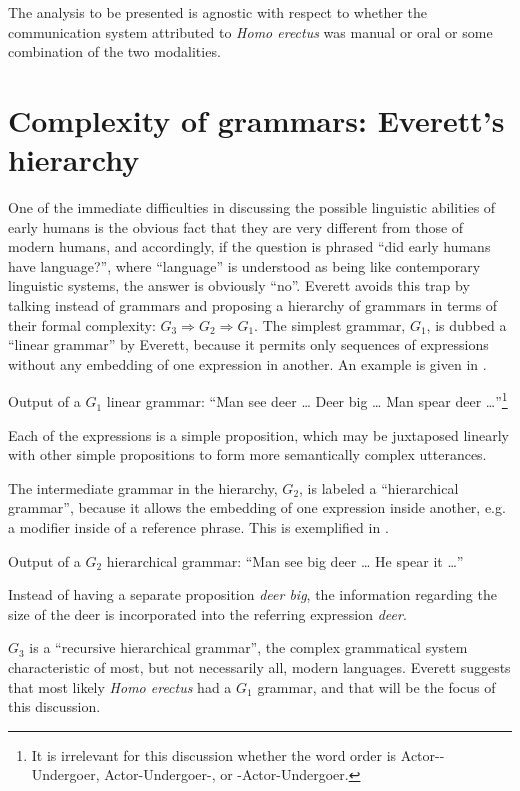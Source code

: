 \documentclass[output=paper,colorlinks,citecolor=brown]{langscibook}
\begin{document}
The analysis to be presented is agnostic with respect to whether the communication system attributed to \emph{Homo erectus} was manual or oral or some combination of the two modalities.

\section{Complexity of grammars: Everett’s hierarchy}\label{sec:vanvalin:2}
One of the immediate difficulties in discussing the possible linguistic abilities of early humans is the obvious fact that they are very different from those of modern humans, and accordingly, if the question is phrased “did early humans have language?”, where “language” is understood as being like contemporary linguistic systems, the answer is obviously “no”.  Everett avoids this trap by talking instead of grammars and proposing a hierarchy of grammars in terms of their formal complexity: $G_3 \Rightarrow G_2 \Rightarrow G_1$.  The simplest grammar, $G_1$, is dubbed a “linear grammar” by Everett, because it permits only sequences of expressions without any embedding of one expression in another. An example is given in .

\ea \label{vanvalin_example_1}
Output of a $G_1$ linear grammar: “Man see deer \ldots{}  Deer big \ldots{}  Man spear deer \ldots”\footnote{It is irrelevant for this discussion whether the word order is Actor--Undergoer, Actor-Undergoer-, or -Actor-Undergoer.}
\z

Each of the expressions is a simple proposition, which may be juxtaposed linearly with other simple propositions to form more semantically complex utterances.

The intermediate grammar in the hierarchy, $G_2$, is labeled a “hierarchical grammar”, because it allows the embedding of one expression inside another, e.g. a modifier inside of a reference phrase.  This is exemplified in .

\ea \label{vanvalin_example_2}
Output of a $G_2$ hierarchical grammar: “Man see big deer \ldots{}  He spear it \ldots”
\z

Instead of having a separate proposition \emph{deer big}, the information regarding the size of the deer is incorporated into the referring expression \emph{deer}.

$G_3$ is a “recursive hierarchical grammar”, the complex grammatical system characteristic of most, but not necessarily all, modern languages.  Everett suggests that most likely \emph{Homo erectus} had a $G_1$ grammar, and that will be the focus of this discussion.
\end{document}
